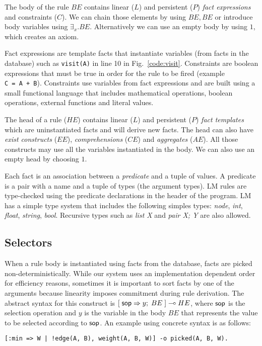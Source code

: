 The body of the rule $BE$ contains linear ($L$) and persistent ($P$) \emph{fact expressions} and
constraints ($C$). We can chain those elements by using $BE, BE$ or introduce body variables using $\exists_{x}. BE$.
Alternatively we can use an empty body by using $1$, which creates an axiom.

Fact expressions are template facts that instantiate variables
(from facts in the database) such as \texttt{visit(A)} in line 10 in Fig.~\ref{code:visit}.
Constraints are boolean expressions that must
be true in order for the rule to be fired (example \texttt{C~=~A~+~B}). Constraints use variables from fact expressions and are built using a small functional language that includes mathematical operations, boolean operations, external functions and literal values.

The head of a rule ($HE$) contains linear ($L$) and persistent ($P$) \emph{fact templates} which are uninstantiated facts and will derive new facts. The head can also have \emph{exist constructs} ($EE$), \emph{comprehensions} ($CE$) and \emph{aggregates} ($AE$). All those constructs
may use all the variables instantiated in the body. We can also use an empty head by choosing $1$.

Each fact is an association between a \emph{predicate} and a tuple of values. A predicate is a pair with a name and a tuple of types (the argument types). LM rules are type-checked using the predicate declarations in the header of the program. LM has a simple type system that includes the following simples types: \emph{node}, \emph{int}, \emph{float}, \emph{string}, \emph{bool}. Recursive types such as \emph{list X} and \emph{pair X; Y} are
also allowed.


\subsection{Selectors}

When a rule body is instantiated using facts from the database, facts are picked
non-deterministically. While our system uses an implementation dependent order for
efficiency reasons, sometimes it is important to sort facts by one of the arguments
because linearity imposes commitment during rule derivation. The abstract syntax for
this construct is $[\; \mathsf{sop} \Rightarrow y; \; BE \;] \multimap HE$, where
$\mathsf{sop}$ is the selection operation and $y$ is the variable in the body $BE$ that
represents the value to be selected according to $\mathsf{sop}$.
An example using concrete syntax is as follows:

\begin{Verbatim}
[:min => W | !edge(A, B), weight(A, B, W)] -o picked(A, B, W).
\end{Verbatim}

